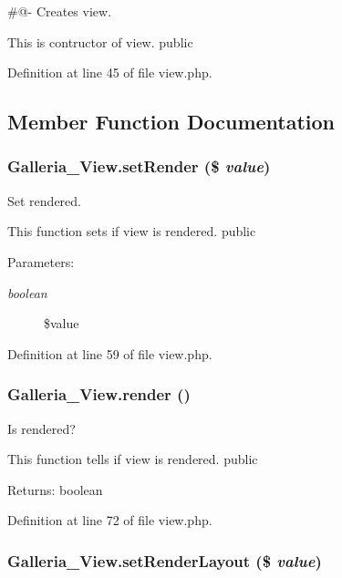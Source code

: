 \#@- Creates view.

This is contructor of view.  public 

Definition at line 45 of file view.php.

\subsection{Member Function Documentation}
\subsubsection{\setlength{\rightskip}{0pt plus 5cm}Galleria\_\-View.setRender (\$ {\em value})}\label{classGalleria__View_c1b8179f90d59b5ab1f2518387273142}


Set rendered.

This function sets if view is rendered.  public \begin{Desc}
\item[Parameters:]
\begin{description}
\item[{\em boolean}]\$value \end{description}
\end{Desc}


Definition at line 59 of file view.php.
\subsubsection{\setlength{\rightskip}{0pt plus 5cm}Galleria\_\-View.render ()}\label{classGalleria__View_0beb1e119ee477b2cdc6d45cf612fb10}


Is rendered?

This function tells if view is rendered.  public \begin{Desc}
\item[Returns:]boolean \end{Desc}


Definition at line 72 of file view.php.
\subsubsection{\setlength{\rightskip}{0pt plus 5cm}Galleria\_\-View.setRenderLayout (\$ {\em value})}\label{classGalleria__View_cca0f0a75564c448375d1ba9541fc712}


